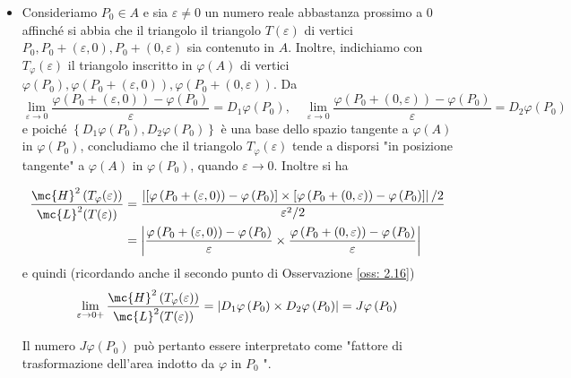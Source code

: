 \begin{itemize}
  \item Consideriamo $P_{0} \in A$ e sia $\varepsilon \neq 0$ un numero reale abbastanza prossimo a 0 affinché si abbia che il triangolo il triangolo $T(\varepsilon)$ di vertici $P_{0}, P_{0}+(\varepsilon, 0), P_{0}+(0, \varepsilon)$ sia contenuto in $A$. Inoltre, indichiamo con $T_{\varphi}(\varepsilon)$ il triangolo inscritto in $\varphi(A)$ di vertici $\varphi\left(P_{0}\right), \varphi\left(P_{0}+(\varepsilon, 0)\right), \varphi\left(P_{0}+(0, \varepsilon)\right)$. Da
    \[\lim _{\varepsilon \rightarrow 0} \frac{\varphi\left(P_{0}+(\varepsilon, 0)\right)-\varphi\left(P_{0}\right)}{\varepsilon}=D_{1} \varphi\left(P_{0}\right), \quad \lim _{\varepsilon \rightarrow 0} \frac{\varphi\left(P_{0}+(0, \varepsilon)\right)-\varphi\left(P_{0}\right)}{\varepsilon}=D_{2} \varphi\left(P_{0}\right)\]
    e poiché $\left\{D_{1} \varphi\left(P_{0}\right), D_{2} \varphi\left(P_{0}\right)\right\}$ è una base dello spazio tangente a $\varphi(A)$ in $\varphi\left(P_{0}\right)$, concludiamo che il triangolo $T_{\varphi}(\varepsilon)$ tende a disporsi "in posizione tangente" a $\varphi(A)$ in $\varphi\left(P_{0}\right)$, quando $\varepsilon \rightarrow 0$. Inoltre si ha

    \[\begin{aligned}
    \frac{\mc{H}^{2}\left(T_{\varphi}(\varepsilon)\right)}{\mc{L}^{2}(T(\varepsilon))} & =\frac{\left|\left[\varphi\left(P_{0}+(\varepsilon, 0)\right)-\varphi\left(P_{0}\right)\right] \times\left[\varphi\left(P_{0}+(0, \varepsilon)\right)-\varphi\left(P_{0}\right)\right]\right| / 2}{\varepsilon^{2} / 2} \\
    & =\left|\frac{\varphi\left(P_{0}+(\varepsilon, 0)\right)-\varphi\left(P_{0}\right)}{\varepsilon} \times \frac{\varphi\left(P_{0}+(0, \varepsilon)\right)-\varphi\left(P_{0}\right)}{\varepsilon}\right|
    \end{aligned}\]
    e quindi (ricordando anche il secondo punto di Osservazione \ref{oss: 2.16})
    \[\lim _{\varepsilon \rightarrow 0+} \frac{\mc{H}^{2}\left(T_{\varphi}(\varepsilon)\right)}{\mc{L}^{2}(T(\varepsilon))}=\left|D_{1} \varphi\left(P_{0}\right) \times D_{2} \varphi\left(P_{0}\right)\right|=J \varphi\left(P_{0}\right)\]

    Il numero $J \varphi\left(P_{0}\right)$ può pertanto essere interpretato come "fattore di trasformazione dell'area indotto da $\varphi$ in $P_{0}$ ".


\end{itemize}
